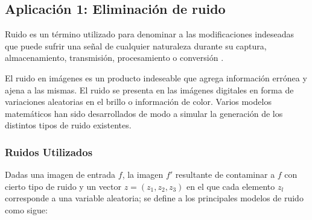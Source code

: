 \subsection{Aplicaci\'on 1: Eliminaci\'on de ruido}
Ruido es un t\'ermino utilizado para denominar a las modificaciones indeseadas que puede sufrir una se\~nal de cualquier naturaleza durante su captura, almacenamiento, transmisi\'on, procesamiento o conversi\'on \cite{tuzlukov2002signal}.

El ruido en im\'agenes es un producto indeseable que agrega informaci\'on err\'onea y ajena a las mismas. El ruido se presenta en las im\'agenes digitales en forma de variaciones aleatorias en el brillo o informaci\'on de color. 
Varios modelos matem\'aticos han sido desarrollados de modo a simular la generaci\'on de los distintos 
tipos de ruido existentes. 
\subsubsection{Ruidos Utilizados} 

Dadas una imagen de entrada $f$, la imagen $f'$ resultante de contaminar a $f$ con cierto tipo de ruido y un vector $z = (z_1, z_2, z_3)$ en el que cada elemento $z_l$  corresponde a una variable aleatoria; se define a los principales modelos de ruido como sigue:

